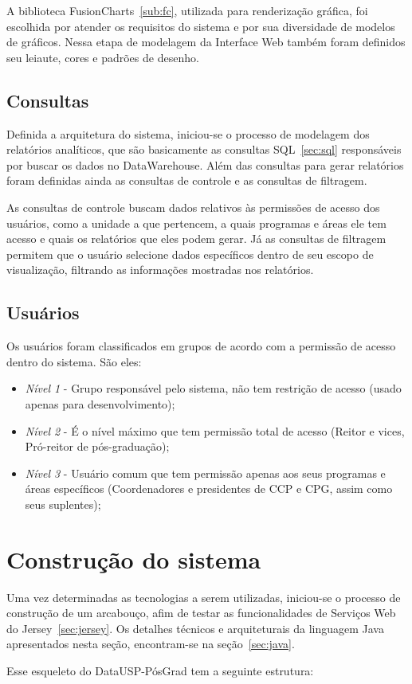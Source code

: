 A biblioteca FusionCharts~\ref{sub:fc}, utilizada para renderização gráfica, foi escolhida por atender os requisitos do sistema e por sua diversidade de modelos de gráficos. Nessa etapa de modelagem da Interface Web também foram definidos seu leiaute, cores e padrões de desenho.

\subsection{Consultas}

Definida a arquitetura do sistema, iniciou-se o processo de modelagem dos relatórios analíticos, que são basicamente as consultas SQL~\ref{sec:sql} responsáveis por buscar os dados no DataWarehouse.  Além das consultas para gerar relatórios foram definidas ainda as consultas de controle e as consultas de filtragem. 
\par
As consultas de controle buscam dados relativos às permissões de acesso dos usuários, como a unidade a que pertencem, a quais programas e áreas ele tem acesso e quais os relatórios que eles podem gerar. Já as consultas de filtragem permitem que o usuário selecione dados específicos dentro de seu escopo de visualização, filtrando as informações mostradas nos relatórios.

\subsection{Usuários}
Os usuários foram classificados em grupos de acordo com a permissão de acesso dentro do sistema. São eles:
\begin{itemize}
\item \emph{Nível 1} - Grupo responsável pelo sistema, não tem restrição de acesso (usado apenas para desenvolvimento);
\item \emph{Nível 2} - É o nível máximo que tem permissão total de acesso (Reitor e vices, Pró-reitor de pós-graduação);
\item \emph{Nível 3} - Usuário comum que tem permissão apenas aos seus programas e áreas específicos (Coordenadores e presidentes de CCP e CPG, assim como seus suplentes);
\end{itemize}

\section{Construção do sistema}

Uma vez determinadas as tecnologias a serem utilizadas, iniciou-se o processo de construção de um arcabouço, afim de testar as funcionalidades de Serviços Web do Jersey~\ref{sec:jersey}. Os detalhes técnicos e arquiteturais da linguagem Java apresentados nesta seção, encontram-se na seção~\ref{sec:java}. 
\par
Esse esqueleto do DataUSP-PósGrad tem a seguinte estrutura:

